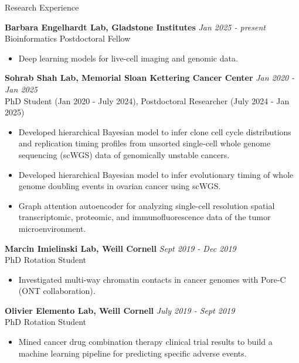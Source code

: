 \documentclass{resume} %
\begin{document}
\begin{rSection}{Research Experience}

{\bf Barbara Engelhardt Lab, Gladstone Institutes} \hfill {\em Jan 2025 - present} \\
Bioinformatics Postdoctoral Fellow
\begin{itemize}
  \item Deep learning models for live-cell imaging and genomic data.
\end{itemize}

{\bf Sohrab Shah Lab, Memorial Sloan Kettering Cancer Center} \hfill {\em Jan 2020 - Jan 2025} \\
PhD Student (Jan 2020 - July 2024), Postdoctoral Researcher (July 2024 - Jan 2025)
\begin{itemize}
  \item Developed hierarchical Bayesian model to infer clone cell cycle distributions and replication timing profiles from unsorted single-cell whole genome sequencing (scWGS) data of genomically unstable cancers.
  \item Developed hierarchical Bayesian model to infer evolutionary timing of whole genome doubling events in ovarian cancer using scWGS.
  \item Graph attention autoencoder for analyzing single-cell resolution spatial transcriptomic, proteomic, and immunofluorescence data of the tumor microenvironment.
\end{itemize}

{\bf Marcin Imielinski Lab, Weill Cornell} \hfill {\em Sept 2019 - Dec 2019} \\
PhD Rotation Student
\begin{itemize}
  \item Investigated multi-way chromatin contacts in cancer genomes with Pore-C (ONT collaboration).
\end{itemize}

{\bf Olivier Elemento Lab, Weill Cornell} \hfill {\em July 2019 - Sept 2019} \\
PhD Rotation Student
\begin{itemize}
  \item Mined cancer drug combination therapy clinical trial results to build a machine learning pipeline for predicting specific adverse events.
\end{itemize}


\end{rSection}
\end{document}
